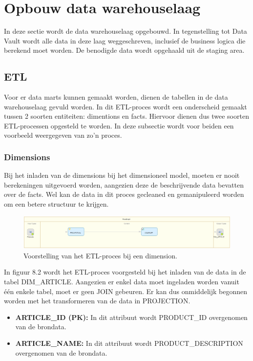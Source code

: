 \section{Opbouw data warehouselaag}
In deze sectie wordt de data warehouselaag opgebouwd. In tegenstelling tot Data Vault wordt alle data in deze laag weggeschreven, inclusief de business logica die berekend moet worden. De benodigde data wordt opgehaald uit de staging area.
\subsection{ETL}
Voor er data marts kunnen gemaakt worden, dienen de tabellen in de data warehouselaag gevuld worden. In dit ETL-proces wordt een onderscheid gemaakt tussen 2 soorten entiteiten: dimentions en facts. Hiervoor dienen dus twee soorten ETL-processen opgesteld te worden. In deze subsectie wordt voor beiden een voorbeeld weergegeven van zo'n proces.

\subsubsection{Dimensions}
Bij het inladen van de dimensions bij het dimensioneel model, moeten er nooit berekeningen uitgevoerd worden, aangezien deze de beschrijvende data bevatten over de facts. Wel kan de data in dit proces gecleaned en gemanipuleerd worden om een betere structuur te krijgen. 

\begin{figure}[h]
	\centering
	\includegraphics[scale=0.5]{../images/DM_FG_dim.png}
	\caption{Voorstelling van het ETL-proces bij een dimension.}
	\label{fig:DM_FG_dim}
\end{figure}

In figuur 8.2 wordt het ETL-proces voorgesteld bij het inladen van de data in de tabel DIM\_ARTICLE. Aangezien er enkel data moet ingeladen worden vanuit één enkele tabel, moet er geen JOIN gebeuren. Er kan dus onmiddelijk begonnen worden met het transformeren van de data in PROJECTION. 

\begin{itemize}
	\item \textbf{ARTICLE\_ID (PK):} In dit attribuut wordt PRODUCT\_ID overgenomen van de brondata.
	\item \textbf{ARTICLE\_NAME:} In dit attribuut wordt PRODUCT\_DESCRIPTION overgenomen van de brondata.
\end{itemize} 

